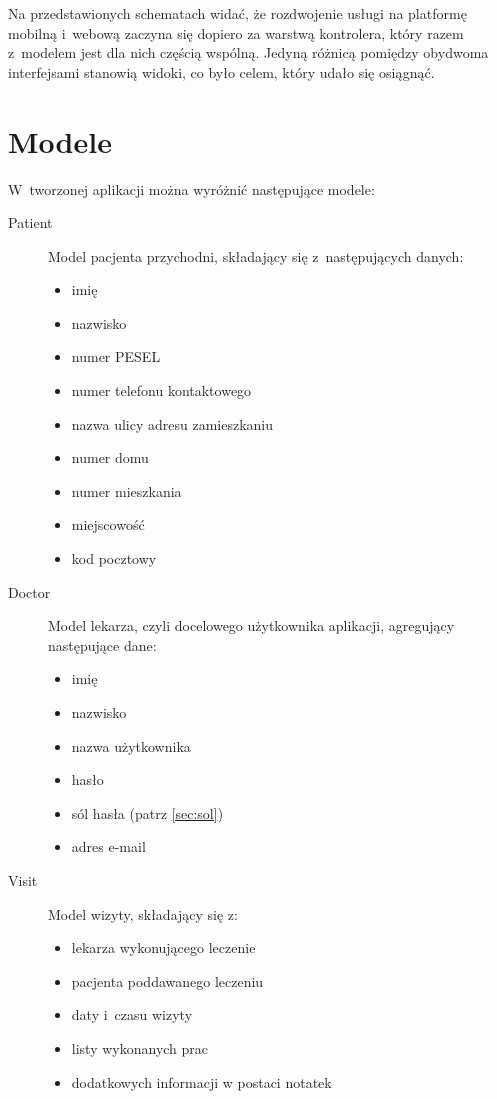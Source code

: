 \documentclass[11pt]{aghdpl}
\begin{document}
Na przedstawionych schematach widać, że rozdwojenie usługi na platformę mobilną i~webową zaczyna się dopiero za warstwą kontrolera, który razem z~modelem jest dla nich częścią wspólną. Jedyną różnicą pomiędzy obydwoma interfejsami stanowią widoki, co było celem, który udało się osiągnąć.

\section{Modele}
\label{sec:modele}

W~tworzonej aplikacji można wyróżnić następujące modele:
\begin{description}
\item[Patient]
	Model pacjenta przychodni, składający się z~następujących danych:
	\begin{itemize}
		\item imię
		\item nazwisko
		\item numer PESEL
		\item numer telefonu kontaktowego
		\item nazwa ulicy adresu zamieszkaniu
		\item numer domu
		\item numer mieszkania
		\item miejscowość
		\item kod pocztowy
	\end{itemize}
\item[Doctor]
	Model lekarza, czyli docelowego użytkownika aplikacji, agregujący następujące dane:
	\begin{itemize}
		\item imię 
		\item nazwisko
		\item nazwa użytkownika
		\item hasło
		\item sól hasła (patrz \ref{sec:sol})
		\item adres e-mail
	\end{itemize}
\item[Visit]
	Model wizyty, składający się z:
	\begin{itemize}
		\item lekarza wykonującego leczenie
		\item pacjenta poddawanego leczeniu
		\item daty i~czasu wizyty
		\item listy wykonanych prac
		\item dodatkowych informacji w postaci notatek

\end{itemize}
\end{description}
\end{document}
